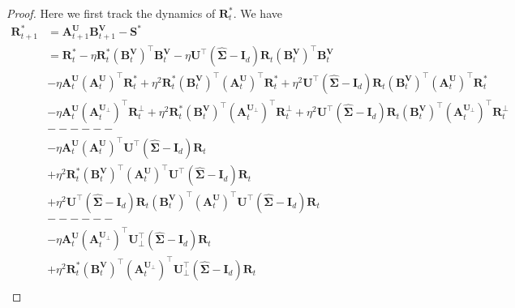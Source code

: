 \begin{proof}
    Here we first track the dynamics of $\bm R^*_t$. We have
    \begin{align*}
        \bm R^*_{t+1} & = \bm A^{\bm U}_{t+1}\bm B_{t+1}^{\bm V} - \bm S^*\\
        & = \bm R^*_t
        - \eta \bm R^*_t \left(\bm B_t^{\bm V}\right)^{\!\top}\bm B_{t}^{\bm V}
        - \eta \bm U^{\!\top}\left(\widehat{\bm \Sigma}
        - \bm I_d\right) \bm R_t \left(\bm B_t^{\bm V}\right)^{\!\top}\bm B_{t}^{\bm V}\\
        & -\eta \bm A^{\bm U}_t\left(\bm A^{\bm U}_t\right)^{\!\top}\bm R^*_t
        + \eta^2 \bm R^*_t \left(\bm B_t^{\bm V}\right)^{\!\top}\left(\bm A^{\bm U}_t\right)^{\!\top}\bm R^*_t
        + \eta^2 \bm U^{\!\top}\left(\widehat{\bm \Sigma}
        - \bm I_d\right) \bm R_t \left(\bm B_t^{\bm V}\right)^{\!\top}\left(\bm A^{\bm U}_t\right)^{\!\top}\bm R^*_t\\
        & - \eta \bm A^{\bm U}_t \left(\bm A^{\bm U_\perp}_t\right)^{\!\top}\bm R^\perp_t
        + \eta^2 \bm R^*_t \left(\bm B_t^{\bm V}\right)^{\!\top}\left(\bm A^{\bm U_\perp}_t\right)^{\!\top}\bm R^\perp_t
        + \eta^2 \bm U^{\!\top}\left(\widehat{\bm \Sigma}
        - \bm I_d\right) \bm R_t \left(\bm B_t^{\bm V}\right)^{\!\top}\left(\bm A^{\bm U_\perp}_t\right)^{\!\top}\bm R^\perp_t\\
        & ------ \\
        & - \eta \bm A^{\bm U}_t \left(\bm A_t^{\bm U}\right)^{\!\top}\bm U^{\!\top}\left(\widehat{\bm \Sigma}-\bm I_d\right)\bm R_t\\
        & + \eta^2 \bm R^*_t \left(\bm B_t^{\bm V}\right)^{\!\top}\left(\bm A_t^{\bm U}\right)^{\!\top}\bm U^{\!\top}\left(\widehat{\bm \Sigma}-\bm I_d\right)\bm R_t\\
        & + \eta^2 \bm U^{\!\top}\left(\widehat{\bm \Sigma}
        - \bm I_d\right) \bm R_t \left(\bm B_t^{\bm V}\right)^{\!\top}\left(\bm A_t^{\bm U}\right)^{\!\top}\bm U^{\!\top}\left(\widehat{\bm \Sigma}-\bm I_d\right)\bm R_t\\
        & ------ \\
        & - \eta \bm A^{\bm U}_t \left(\bm A_t^{\bm U_\perp}\right)^{\!\top}\bm U_\perp^{\!\top}\left(\widehat{\bm \Sigma}-\bm I_d\right)\bm R_t \\
        & + \eta^2 \bm R^*_t \left(\bm B_t^{\bm V}\right)^{\!\top}\left(\bm A_t^{\bm U_\perp}\right)^{\!\top}\bm U_\perp^{\!\top}\left(\widehat{\bm \Sigma}-\bm I_d\right)\bm R_t\\

\end{align*}
\end{proof}
